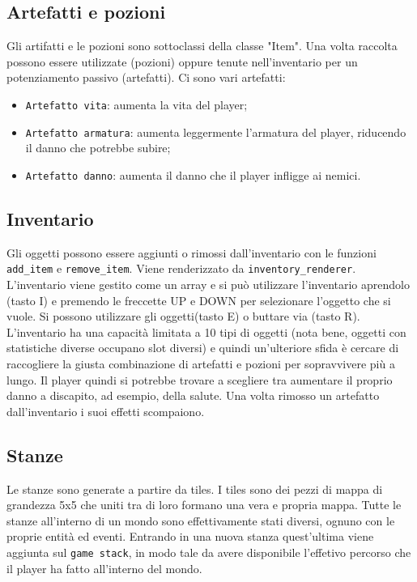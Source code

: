 \documentclass{article}
\begin{document}
\subsection{Artefatti e pozioni}
Gli artifatti e le pozioni sono sottoclassi della classe "Item". Una volta raccolta possono essere utilizzate (pozioni) oppure tenute nell'inventario per un potenziamento passivo (artefatti).
Ci sono vari artefatti:
 \begin{itemize}
     \item \verb|Artefatto vita|: aumenta la vita del player;
     \item \verb|Artefatto armatura|: aumenta leggermente l'armatura del player, riducendo il danno che potrebbe subire;
     \item \verb|Artefatto danno|: aumenta il danno che il player infligge ai nemici.
 \end{itemize}
 
 \subsection{Inventario}
 Gli oggetti possono essere aggiunti o rimossi dall'inventario con le funzioni \verb|add_item| e \verb|remove_item|. 
 Viene renderizzato da \verb|inventory_renderer|.
 L'inventario viene gestito come un array e si può utilizzare l'inventario aprendolo (tasto I) e premendo le freccette UP e DOWN per selezionare l'oggetto che si vuole.
 Si possono utilizzare gli oggetti(tasto E) o buttare via (tasto R).
 L'inventario ha una capacità limitata a 10 tipi di oggetti (nota bene, oggetti con statistiche diverse occupano slot diversi) e quindi un'ulteriore sfida è cercare di raccogliere la giusta combinazione di artefatti e pozioni per sopravvivere più a lungo. Il player quindi si potrebbe trovare a scegliere tra aumentare il proprio danno a discapito, ad esempio, della salute. Una volta rimosso un artefatto dall'inventario i suoi effetti scompaiono.
\subsection{Stanze}
Le stanze sono generate a partire da tiles.
I tiles sono dei pezzi di mappa di grandezza 5x5 che uniti tra di loro formano una vera e propria mappa.
Tutte le stanze all'interno di un mondo sono effettivamente stati diversi, ognuno con le proprie entità ed eventi. Entrando in una nuova stanza quest'ultima viene aggiunta sul \verb|game stack|, in modo tale da avere disponibile l'effetivo percorso che il player ha fatto all'interno del mondo.
\end{document}
